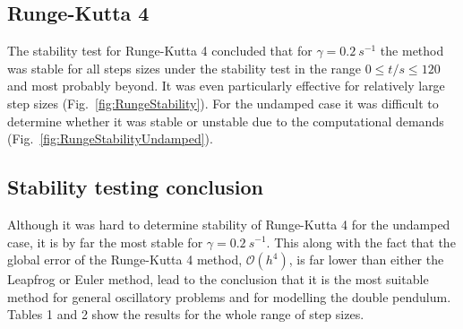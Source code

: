 \documentclass[10pt,a4paper]{article}
\begin{document}
\newpage
\subsection{Runge-Kutta 4}
The stability test for Runge-Kutta 4 concluded that for $\gamma = 0.2\: s^{-1}$ the method was stable for all steps sizes under the stability test in the range $0\leq t/s \leq 120$ and most probably beyond. It was even particularly effective for relatively large step sizes (Fig.~\ref{fig:RungeStability}). For the undamped case it was difficult to determine whether it was stable or unstable due to the computational demands (Fig.~\ref{fig:RungeStabilityUndamped}).

\subsection{Stability testing conclusion}
Although it was hard to determine stability of Runge-Kutta 4 for the undamped case, it is by far the most stable for $\gamma = 0.2\:s^{-1}$. This along with the fact that the global error of the Runge-Kutta 4 method, $\mathcal{O}(h^4)$, is far lower than either the Leapfrog or Euler method, lead to the conclusion that it is the most suitable method for general oscillatory problems and for modelling the double pendulum. Tables 1 and 2 show the results for the whole range of step sizes. 
\end{document}
